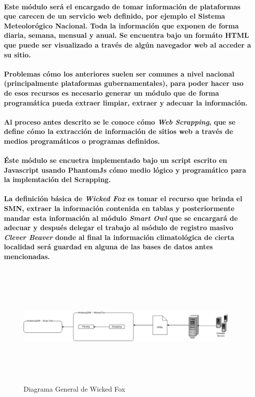     \paragraph{Este módulo será el encargado de tomar información de plataformas que carecen de un servicio web definido, por ejemplo el Sistema Meteolorógico Nacional. Toda la información que exponen de forma diaria, semana, mensual y anual. Se encuentra bajo un formáto HTML que puede ser visualizado a través de algún navegador web al acceder a su sitio.}
    \paragraph{Problemas cómo los anteriores suelen ser comunes a nivel nacional (principalmente plataformas gubernamentales), para poder hacer uso de esos recursos es necesario generar un módulo que de forma programática pueda extraer limpiar, extraer y adecuar la información.}
    \paragraph{Al proceso antes descrito se le conoce cómo \emph{Web Scrapping}\cite{6}, que se define cómo la extracción de información de sitios web a través de medios programáticos o programas definidos.}
    \paragraph{Éste módulo se encuetra implementado bajo un script escrito en Javascript usando PhantomJs cómo medio lógico y programático para la implemtación del Scrapping.}
    \paragraph{ La definición básica de \textbf{\emph{Wicked Fox}} es tomar el recurso que brinda el SMN, extraer la información contenida en tablas y posteriormente mandar esta información al módulo \textbf{\emph{Smart Owl}} que se encargará de adecuar y después delegar el trabajo al módulo de registro masivo \textbf{\emph{Clever Beaver}} donde al final la información climatológica de cierta localidad será guardad en alguna de las bases de datos antes mencionadas.}
      \begin{landscape}
        \begin{figure}[h!]
        \centering
        \includegraphics[width=11cm,height=6cm]{./images/DiagramaWickedFox.png}
        \caption{Diagrama General de Wicked Fox}
      \end{figure}
      \end{landscape}
